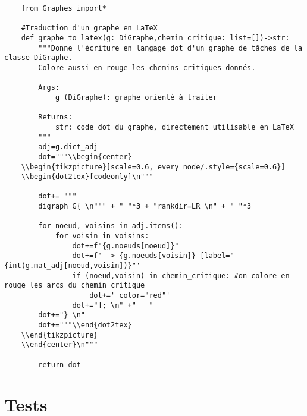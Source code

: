 \documentclass{article}
\begin{document}
\begin{verbatim}
    from Graphes import*

    #Traduction d'un graphe en LaTeX
    def graphe_to_latex(g: DiGraphe,chemin_critique: list=[])->str:
        """Donne l'écriture en langage dot d'un graphe de tâches de la classe DiGraphe.
        Colore aussi en rouge les chemins critiques donnés.

        Args:
            g (DiGraphe): graphe orienté à traiter

        Returns:
            str: code dot du graphe, directement utilisable en LaTeX
        """
        adj=g.dict_adj
        dot="""\\begin{center}
    \\begin{tikzpicture}[scale=0.6, every node/.style={scale=0.6}]
    \\begin{dot2tex}[codeonly]\n"""
        
        dot+= """
        digraph G{ \n""" + " "*3 + "rankdir=LR \n" + " "*3
        
        for noeud, voisins in adj.items():
            for voisin in voisins:
                dot+=f"{g.noeuds[noeud]}"
                dot+=f' -> {g.noeuds[voisin]} [label="{int(g.mat_adj[noeud,voisin])}"'
                if (noeud,voisin) in chemin_critique: #on colore en rouge les arcs du chemin critique
                    dot+=' color="red"'
                dot+="]; \n" +"   "
        dot+="} \n"
        dot+="""\\end{dot2tex}
    \\end{tikzpicture}
    \\end{center}\n"""

        return dot
\end{verbatim}

\section{Tests}
\end{document}
